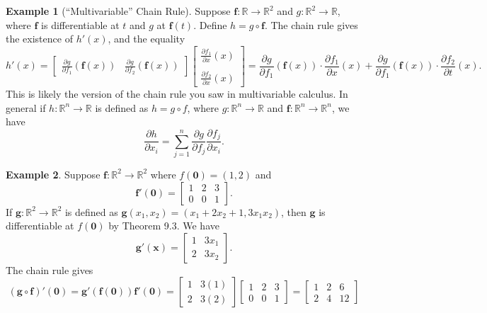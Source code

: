 \documentclass{article}
\newcommand{\R}{\mathbb{R}}
\newcommand{\x}{\mathbf{x}}
\newcommand{\f}{\mathbf{f}}
\newcommand{\ze}{\mathbf{0}}
\theoremstyle{definition}
\newtheorem{example}{Example}[section]
\begin{document}
	\begin{example}[``Multivariable'' Chain Rule]
		Suppose $ \f:\R\to\R^2 $ and $ g:\R^2\to\R $, where $ \f $ is differentiable at $ t $ and $ g $ at $ \f(t) $. Define $ h=g\circ\f $. The chain rule gives the existence of $h'(x) $, and the equality
		$$ h'(x) =  \begin{bmatrix}
			\frac{\partial g}{\partial f_1}(\f(x)) & \frac{\partial g}{\partial f_2}(\f(x))
		\end{bmatrix}\begin{bmatrix}
			\frac{\partial f_1}{\partial x}(x)\\\\ \frac{\partial f_2}{\partial x}(x)
		\end{bmatrix} = \frac{\partial g}{\partial f_1}(\f(x))\cdot 	\frac{\partial f_1}{\partial x}(x) + \frac{\partial g}{\partial f_1}(\f(x))\cdot 	\frac{\partial f_2}{\partial t}(x).$$
		This is likely the version of the chain rule you saw in multivariable calculus. In general if $ h:\R^n\to \R $ is defined as $ h=g\circ f $, where $ g:\R^n\to\R $ and $ \f:\R^n\to\R^n $, 
		we have $$ \frac{\partial h}{\partial x_i}= \sum_{j=1}^n\frac{\partial g}{\partial f_j}\frac{\partial f_j}{\partial x_i} .$$
	\end{example}
	\begin{example}
		Suppose $ \f:\R^2\to \R^2 $ where $ f(\ze)=(1,2) $ and $$ \f'(\ze) = \begin{bmatrix}
			1&2&3\\0&0&1
		\end{bmatrix}.$$
		If $ \mathbf g:\R^2\to\R^2 $ is defined as $ \mathbf g(x_1,x_2)= (x_1+2x_2+1,3x_1x_2) $, then $ \mathbf g $ is differentiable at $ f(\ze) $ by Theorem 9.3. We have 
		$$ \mathbf g'(\x) = \begin{bmatrix}
			1 & 3x_1\\2 & 3x_2
		\end{bmatrix}.$$
		The chain rule gives 
		$$ (\mathbf g\circ \mathbf f)'(\ze) = \mathbf g'(\f(\ze))\f'(\ze) = \begin{bmatrix}
			1 & 3(1)\\2 & 3(2)
		\end{bmatrix}\begin{bmatrix}
			1&2&3\\0&0&1
		\end{bmatrix} = \begin{bmatrix}
			1&2&6\\2&4&12
		\end{bmatrix} $$
	\end{example}
\end{document}
